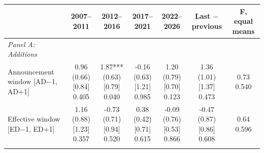 \begin{threeparttable}
\begingroup
\renewcommand\cellalign{t}
\renewcommand\arraystretch{1}
\setlength{\tabcolsep}{5pt}
\begin{tabular}{@{}lcccccc}
\toprule
 & 2007–2011 & 2012–2016 & 2017–2021 & 2022–2026 & Last $-$ previous & F, equal means \\
\midrule
\emph{Panel A: Additions} \\
\addlinespace[0.25ex]
\addlinespace[1ex]
Announcement window [AD$-$1, AD+1] & \makecell{0.96\\(0.66)\\{}[0.84]\\{0.405}} & \makecell{1.87***\\(0.63)\\{}[0.79]\\{0.040}} & \makecell{-0.16\\(0.63)\\{}[1.21]\\{0.985}} & \makecell{1.20\\(0.79)\\{}[0.70]\\{0.123}} & \makecell{1.36\\(1.01)\\{}[1.37]\\{0.473}} & \makecell{0.73\\{0.540}} \\
\addlinespace[0.25ex]
\addlinespace[0.25ex]
Effective window [ED$-$1, ED+1] & \makecell{1.16\\(0.88)\\{}[1.23]\\{0.357}} & \makecell{-0.73\\(0.71)\\{}[0.94]\\{0.520}} & \makecell{0.38\\(0.42)\\{}[0.71]\\{0.615}} & \makecell{-0.09\\(0.76)\\{}[0.53]\\{0.866}} & \makecell{-0.47\\(0.87)\\{}[0.86]\\{0.608}} & \makecell{0.64\\{0.596}} \\
\addlinespace[0.25ex]
\addlinespace[0.25ex]

\end{tabular}
\end{threeparttable}

